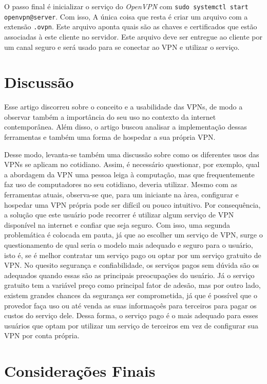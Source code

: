 \documentclass[12pt]{article}
\begin{document}
\begin{flushleft}
O passo final é inicializar o serviço do \emph{OpenVPN} com \texttt{sudo systemctl start openvpn@server}. 
Com isso, A única coisa que resta é criar um arquivo com a extensão \texttt{.ovpn}. Este arquivo aponta quais são
as chaves e certificados que estão associadas à este cliente no servidor. Este arquivo deve ser entregue ao cliente por
um canal seguro e será usado para se conectar ao VPN e utilizar o serviço.   

\section{Discussão}

Esse artigo discorreu sobre o conceito e a usabilidade das VPNs, de modo a observar também a importância
do seu uso no contexto da internet contemporânea. Além disso, o artigo buscou analisar a implementação
dessas ferramentas e também uma forma de hospedar a sua própria VPN.

Desse modo, levanta-se também uma discussão sobre como os diferentes usos das VPNs se aplicam no cotidiano.
Assim, é necessário questionar, por exemplo, qual a abordagem da VPN uma pessoa leiga à
computação, mas que frequentemente faz uso de computadores no seu cotidiano, deveria utilizar.
Mesmo com as ferramentas atuais, observa-se que, para um iniciante na àrea, configurar e hospedar
uma VPN própria pode ser difícil ou pouco intuitivo.
Por consequência, a solução que este usuário pode recorrer é utilizar algum serviço de VPN disponível
na internet e confiar que seja seguro. 
Com isso, uma segunda problemática é colocada em pauta, já que ao escolher um serviço de VPN, 
surge o questionamento de qual seria o modelo mais adequado e seguro para o usuário, isto é, se é melhor
contratar um serviço pago ou optar por um serviço gratuito de VPN.
No quesito segurança e confiabilidade, os serviços pagos sem dúvida são os adequados quando essas
são as principais preocupações do usuário.
Já o serviço gratuito tem a variável preço como principal fator de adesão, mas por outro lado, existem
grandes chances da segurança ser comprometida, já que é possível que o provedor faça uso ou até venda
as suas informaçoês para terceiros para pagar os custos do serviço dele.
Dessa forma, o serviço pago é o mais adequado para esses usuários que optam por utilizar um serviço de
terceiros em vez de configurar sua VPN por conta própria. 


\section{Considerações Finais}


\end{flushleft}
\end{document}
